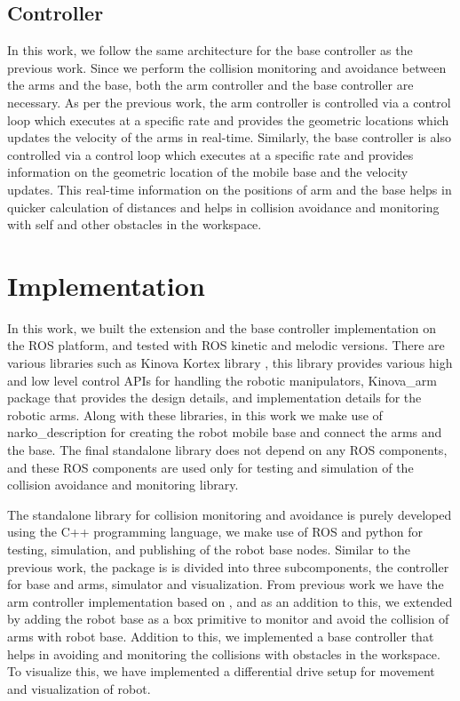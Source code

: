 \documentclass[a4paper, 11.5pt, conference]{ieeeconf}      %
\begin{document}
\subsection{Controller} 
In this work, we follow the same architecture for the base controller as the previous work. Since we perform the collision monitoring and avoidance between the arms and the base, both the arm controller and the base controller are necessary. As per the previous work, the arm controller is controlled via a control loop which executes at a specific rate and provides the geometric locations which updates the velocity of the arms in real-time. Similarly, the base controller is also controlled via a control loop which executes at a specific rate and provides information on the geometric location of the mobile base and the velocity updates. This real-time information on the positions of arm and the base helps in quicker calculation of distances and helps in collision avoidance and monitoring with self and other obstacles in the workspace.
 
\section{Implementation}
In this work, we built the extension and the base controller implementation on the ROS platform, and tested with ROS kinetic and melodic versions. There are various libraries such as Kinova Kortex library \cite{kortex}, this library provides various high and low level control APIs for handling the robotic manipulators, Kinova\_arm package that provides the design details, and implementation details for the robotic arms. Along with these libraries, in this work we make use of narko\_description for creating the robot mobile base and connect the arms and the base. The final standalone library does not depend on any ROS components, and these ROS components are used only for testing and simulation of the collision avoidance and monitoring library.

The standalone library for collision monitoring and avoidance is purely developed using the C++ programming language, we make use of ROS and python for testing, simulation, and publishing of the robot base nodes. Similar to the previous work, the package is is divided into three subcomponents, the controller for base and arms, simulator and visualization. From previous work we have the arm controller implementation based on \cite{Hoffmann}, and as an addition to this, we extended by adding the robot base as a box primitive to monitor and avoid the collision of arms with robot base. Addition to this, we implemented a base controller that helps in avoiding and monitoring the collisions with obstacles in the workspace. To visualize this, we have implemented a differential drive setup for movement and visualization of robot.
\end{document}

